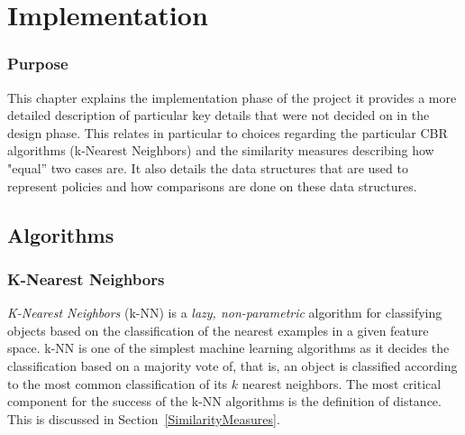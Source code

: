  
 

\chapter{Implementation}\label{impl}

\minitoc

\subsection*{Purpose}
This chapter explains the implementation phase of the project it provides a more detailed description of particular key
details that were not decided on in the design phase. This relates in particular to choices regarding the particular CBR algorithms
(k-Nearest Neighbors) and the similarity measures describing how "equal'' two cases are. It also details the data structures that
are used to represent policies and how comparisons are done on these data structures.

\section{Algorithms}

\subsection{K-Nearest Neighbors}\label{kNN}

\emph{K-Nearest Neighbors} (k-NN) is a \emph{lazy, non-parametric} algorithm for classifying objects based on the classification of the nearest examples in a given feature space. k-NN is one of the simplest machine learning algorithms as it decides the classification based on a majority vote of, that is, an object is classified according to the most common classification of its $k$ nearest neighbors. The most critical component for the success of the k-NN algorithms is the definition of distance. This is discussed in Section~\ref{SimilarityMeasures}. 

